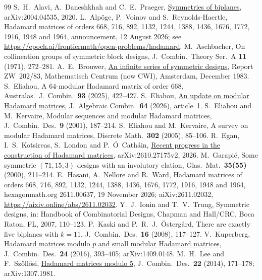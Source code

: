 \documentclass[10pt]{article}
\theoremstyle{remark}
\begin{document}
\begin{footnotesize}
\begin{thebibliography}{99}
 S.~H.~Alavi, A.~Daneshkhah and C.~E.~Praeger, \href{https://arxiv.org/abs/2004.04535}{Symmetries of biplanes}, arXiv:2004.04535, 2020.
 L.~Alp\"oge, P.~Voinov and S.~Reynolds-Haertle, Hadamard matrices of orders 668, 716, 892, 1132, 1244, 1388, 1436, 1676, 1772, 1916, 1948 and 1964, announcement, 12 August 2026; see \url{https://epoch.ai/frontiermath/open-problems/hadamard}.
 M.~Aschbacher, On collineation groups of symmetric block designs, J.\ Combin.\ Theory Ser.\ A \textbf{11} (1971), 272--281.
 A.~E.~Brouwer, \href{https://ir.cwi.nl/pub/6553/6553D.pdf}{An infinite series of symmetric designs}, Report ZW~202/83, Mathematisch Centrum (now CWI), Amsterdam, December 1983.
 S.~Eliahou, A $64$-modular Hadamard matrix of order $668$, Australas.\ J.\ Combin.\ \textbf{93} (2025), 422--427.
S.~Eliahou, \href{https://doi.org/10.1007/s10801-026-01544-5}{An update on modular Hadamard matrices}, J.\ Algebraic Combin.\ \textbf{64} (2026), article~1.
 S.~Eliahou and M.~Kervaire, Modular sequences and modular Hadamard matrices, J.\ Combin.\ Des.\ \textbf{9} (2001), 187--214.
 S.~Eliahou and M.~Kervaire, A survey on modular Hadamard matrices, Discrete Math.\ \textbf{302} (2005), 85--106.
 R.~Egan, I.~S.~Kotsireas, S.~London and P.~\'O~Cath\'ain, \href{https://arxiv.org/abs/2610.27175}{Recent progress in the construction of Hadamard matrices}, arXiv:2610.27175v2, 2026.
 M.~Garapi\'c, Some symmetric $(71,15,3)$ designs with an involutory elation, Glas.\ Mat.\ \textbf{35(55)} (2000), 211--214.
 E.~Hasani, A.~Nellore and R.~Ward, Hadamard matrices of orders 668, 716, 892, 1132, 1244, 1388, 1436, 1676, 1772, 1916, 1948 and 1964, hexagonmath.org 2611.00637, 19 November 2026; aiXiv:2611.02032, \url{https://aixiv.online/abs/2611.02032}.
 Y.~J.~Ionin and T.~V.~Trung, Symmetric designs, in: Handbook of Combinatorial Designs, Chapman and Hall/CRC, Boca Raton, FL, 2007, 110--123.
 P.~Kaski and P.~R.~J.~\"Osterg\aa rd, There are exactly five biplanes with $k=11$, J.\ Combin.\ Des.\ \textbf{16} (2008), 117--127.
 V.~Kuperberg, \href{https://arxiv.org/abs/1409.0148}{Hadamard matrices modulo $p$ and small modular Hadamard matrices}, J.\ Combin.\ Des.\ \textbf{24} (2016), 393--405; arXiv:1409.0148.
 M.~H.~Lee and F.~Sz\H{o}ll\H{o}si, \href{https://arxiv.org/abs/1307.1981}{Hadamard matrices modulo 5}, J.\ Combin.\ Des.\ \textbf{22} (2014), 171--178; arXiv:1307.1981.

\end{thebibliography}
\end{footnotesize}
\end{document}
